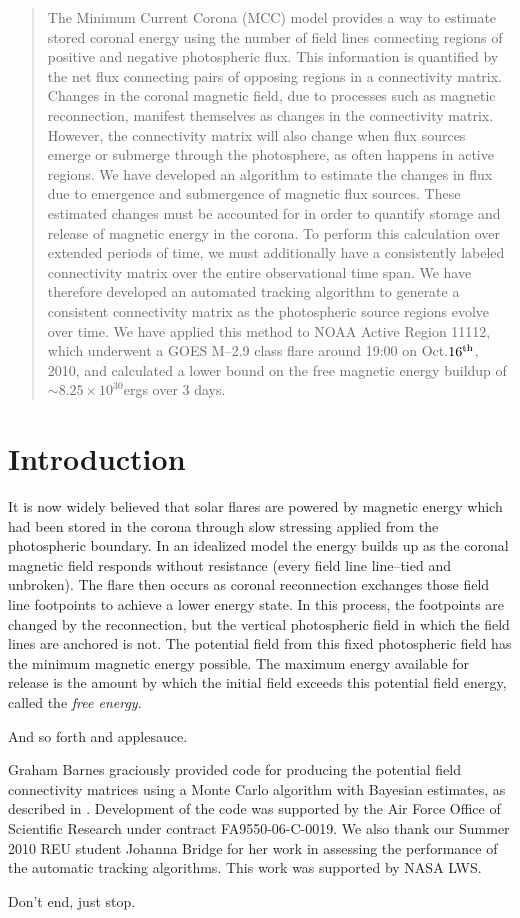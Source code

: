 \begin{abstract}
   The Minimum Current Corona (MCC) model provides a way to estimate stored coronal energy using the number of field lines connecting regions of positive and negative photospheric flux.  This information is quantified by the net flux connecting pairs of opposing regions in a connectivity matrix.  Changes in the coronal magnetic field, due to processes such as magnetic reconnection, manifest themselves as changes in the connectivity matrix.  However, the connectivity matrix will also change when flux sources emerge or submerge through the photosphere, as often happens in active regions.  We have developed an algorithm to estimate the changes in flux due to emergence and submergence of magnetic flux sources.  These estimated changes must be accounted for in order to quantify storage and release of magnetic energy in the corona.  To perform this calculation over extended periods of time, we must additionally have a consistently labeled connectivity matrix over the entire observational time span.  We have therefore developed an automated tracking algorithm to generate a consistent connectivity matrix as the photospheric source regions evolve over time.  We have applied this method to NOAA Active Region 11112, which underwent a GOES M--2.9 class flare around 19:00 on Oct.$16^{\hbox{\scriptsize th}}$, 2010, and calculated a lower bound on the free magnetic energy buildup of $\sim 8.25 \times 10^{30}$ergs over 3 days.
 \end{abstract}
 

\section{\label{sec:intro2}Introduction}
 
 It is now widely believed that solar flares are powered by magnetic energy which had been stored in the corona through slow stressing applied from the photospheric boundary.  In an idealized model the energy builds up as the coronal magnetic field responds without resistance (every field line line--tied and unbroken).  The flare then occurs as coronal reconnection exchanges those field line footpoints to achieve a lower energy state.  In this process, the footpoints are changed by the reconnection, but the vertical photospheric field in which the field lines are anchored is not.  The potential field from this fixed photospheric field has the minimum magnetic energy possible.  The maximum energy available for release is the amount by which the initial field exceeds this potential field energy, called the {\em free energy}. 

And so forth and applesauce.
 
  \subacknowledgements
  Graham Barnes graciously provided code for producing the potential field connectivity matrices using a Monte Carlo algorithm with Bayesian estimates, as described in .  Development of the code was supported by the Air Force Office of Scientific Research under contract FA9550-06-C-0019.  We also thank our Summer 2010 REU student Johanna Bridge for her work in assessing the performance of the automatic tracking algorithms.  This work was supported by NASA LWS.

  
Don't end, just stop.

